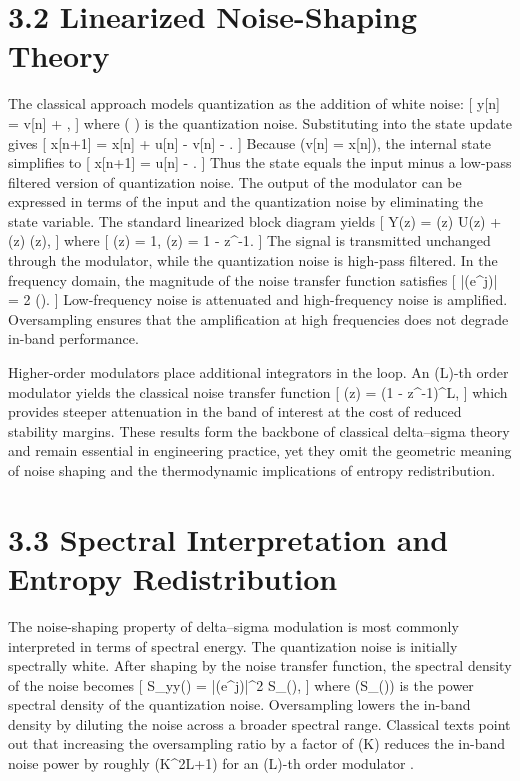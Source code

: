 \section*{3.2 Linearized Noise-Shaping Theory}

The classical approach models quantization as the addition of white noise:
[
y[n] = v[n] + \eta[n],
]
where ( \eta[n] ) is the quantization noise. Substituting into the state update gives
[
x[n+1] = x[n] + u[n] - v[n] - \eta[n].
]
Because (v[n] = x[n]), the internal state simplifies to
[
x[n+1] = u[n] - \eta[n].
]
Thus the state equals the input minus a low-pass filtered version of quantization noise. The output of the modulator can be expressed in terms of the input and the quantization noise by eliminating the state variable. The standard linearized block diagram yields
[
Y(z) = (z) U(z) + (z) \Eta(z),
]
where
[
(z) = 1, \qquad {}(z) = 1 - z^{-1}.
]
The signal is transmitted unchanged through the modulator, while the quantization noise is high-pass filtered. In the frequency domain, the magnitude of the noise transfer function satisfies
[
|(e^{j\omega})| = 2 \sin\left(\right).
]
Low-frequency noise is attenuated and high-frequency noise is amplified. Oversampling ensures that the amplification at high frequencies does not degrade in-band performance.

Higher-order modulators place additional integrators in the loop. An (L)-th order modulator yields the classical noise transfer function
[
(z) = (1 - z^{-1})^L,
]
which provides steeper attenuation in the band of interest at the cost of reduced stability margins. These results form the backbone of classical delta--sigma theory and remain essential in engineering practice, yet they omit the geometric meaning of noise shaping and the thermodynamic implications of entropy redistribution.

\section*{3.3 Spectral Interpretation and Entropy Redistribution}

The noise-shaping property of delta--sigma modulation is most commonly interpreted in terms of spectral energy. The quantization noise is initially spectrally white. After shaping by the noise transfer function, the spectral density of the noise becomes
[
S_{yy}(\omega) = |(e^{j\omega})|^2 S_{\eta\eta}(\omega),
]
where (S_{\eta\eta}(\omega)) is the power spectral density of the quantization noise. Oversampling lowers the in-band density by diluting the noise across a broader spectral range. Classical texts point out that increasing the oversampling ratio by a factor of (K) reduces the in-band noise power by roughly (K^{2L+1}) for an (L)-th order modulator \citep{schreier2005understanding}.

